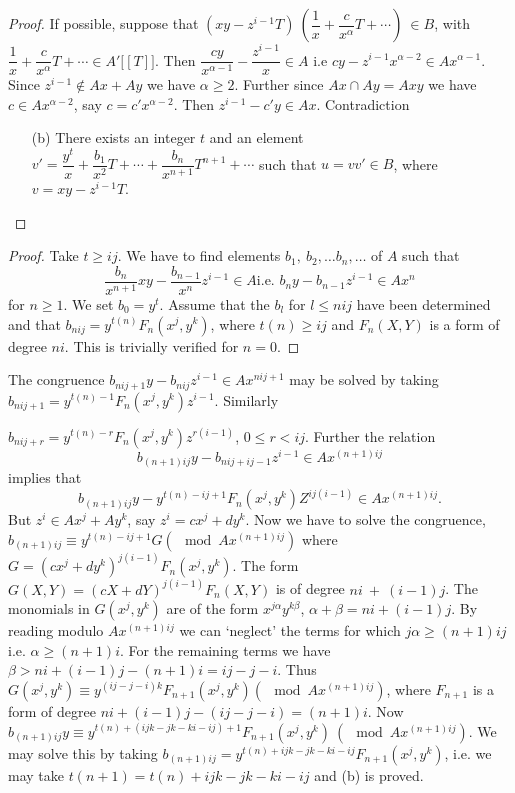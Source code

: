 \begin{proof}
If possible, suppose that $(xy - z^{i - 1} T) ~ (\dfrac{1}{x} +
\dfrac{c}{x^\alpha }T + \cdots ) ~ \in B$, with $\dfrac{1}{x}+
\dfrac{c}{x^\alpha} T + \cdots \in A' \big [[T]\big]$. Then
$\dfrac{cy}{x^{\alpha - 1}} - \dfrac{z^{i - 1}}{x} \in A $ i.e $cy -
z^{i - 1} x^{\alpha - 2} \in A x^{\alpha - 1}$. Since $z^{i -1} \notin
Ax + Ay$ we have $\alpha \ge 2$. Further since $Ax \cap Ay = Axy$ we
have $c\in Ax^{\alpha-2}$, say $c = c' x^{\alpha-2}$. Then $z^{i-1} - c' y \in
Ax$. Contradiction 
\begin{enumerate}
\item[(b)] There exists an integer $t$ and an element $v' =
  \dfrac{y^t}{x}+ \dfrac{b_1}{x^2} T + \cdots + \dfrac{b_n}{x^{n+1}}
  T^{n+1} + \cdots $ such that $u = v v' \in B$, where $v = xy -
  z^{i-1} T$.  
\end{enumerate}
\end{proof}

\begin{proof}
Take $t \geq ij$. We have to find elements $b_1, ~ b_2, \ldots b_n,
\ldots $ of $A$ such that 
$$
\frac{b_n}{x^{n+1}} xy - \frac{b_{n-1}}{x^n} z^{i - 1} \in A \text{
  i.e. } b_n y - b_{n-1} z^{i - 1} \in Ax^n 
$$\pageoriginale
for $n \ge 1$. We set $b_0 = y^t$. Assume that the $b_l$ for $l \le
nij$ have been determined and that $b_{nij} = y^{t(n)} F _n (x^j,
y^k)$, where $t(n) \ge ij$ and $F_n (X, Y)$ is a form of degree
$ni$. This is trivially verified for $n = 0$. 
\end{proof}

\noindent
The congruence $b_{ni j +1 } y - b_{nij} z^{i -1} \in Ax^{nij +1}$
may be solved by taking $b_{nij + 1} = y^{t(n) - 1} F_n (x^j, y^k)
z^{i - 1}$. Similarly 
    
\noindent
$b_{nij + r} = y^{t(n) -r} F_n (x^j, y^k) z^{r (i - 1)}$, $0 \le r <
ij$. Further the relation 
$$b_{(n+1)ij } y - b_{nij+ij-1} z^{i-1} \in
Ax^{(n + 1)ij}$$ 
implies that 
$$b_{(n+1)ij} y  - y^{t(n) - ij +1} F_n (x^j,
y^k) Z^{ij(i-1)} \in Ax^{(n+1)ij}.$$ 
But $z^i \in Ax^j + Ay^k$, say
$z^i = cx^j + dy^k$. Now we have to solve the congruence, $b_{(n + 1)
  ij} \equiv y^{t(n) - ij +1} G (\mod Ax^{(n+1)ij})$ where $G = (cx^j
+ dy^k)^{j (i - 1)} F_n (x^j, y^k)$. The form $G(X, Y) = (c X +
dY)^{j(i - 1)} F_n (X, Y)$ is of degree $ni ~ + ~ (i - 1)j$. The
monomials in $G(x^j, y^k)$ are of the form $x^{j \alpha} y^{k \beta}$,
$\alpha + \beta = ni + (i - 1)j$. By reading modulo $Ax^{(n + 1)ij}$ we
can `neglect' the terms for which $j \alpha \ge (n + 1) ij $
i.e. $\alpha \ge (n+1)i$. For the remaining terms we have $\beta > ni
+ (i - 1) j - (n + 1) i = ij - j - i$. Thus $G(x^j, y^k) \equiv y^{(ij
  - j - i)k} F_{n + 1} (x^j, y^k) (\mod Ax^{(n+1) ij})$, where
$F_{n+1}$ is a form of degree $ni + (i - 1)j - (ij-j-i) = (n+1)i$. Now
$b_{(n+1) ij} y \equiv y^{t(n) + (ijk - jk - ki -ij) + 1} F_{n+1} (x^j,
y^k) ~ (\mod Ax^{(n+1) ij})$. We may solve this by taking $b_{(n+1)ij}
= y^{t(n) + ijk -jk -ki -ij } F_{n+1} (x^j, y^k)$, i.e. we may take
$t(n+1) = t(n) + ijk - jk - ki - ij$ and (b) is proved. 

